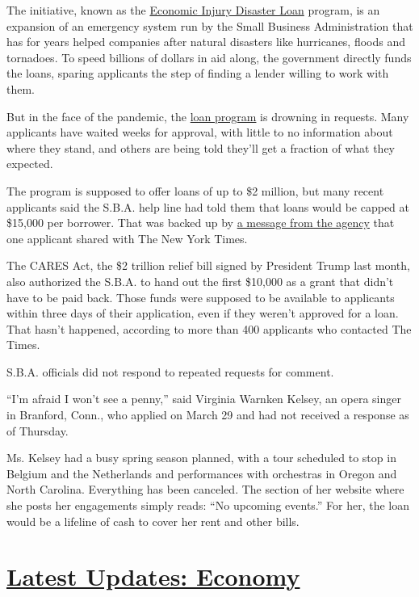 The initiative, known as the
\href{https://www.sba.gov/funding-programs/loans/coronavirus-relief-options/economic-injury-disaster-loan-emergency-advance}{Economic
Injury Disaster Loan} program, is an expansion of an emergency system
run by the Small Business Administration that has for years helped
companies after natural disasters like hurricanes, floods and tornadoes.
To speed billions of dollars in aid along, the government directly funds
the loans, sparing applicants the step of finding a lender willing to
work with them.

But in the face of the pandemic, the
\href{https://www.nytimes.com/2020/04/20/business/shake-shack-returning-loan-ppp-coronavirus.html}{loan
program} is drowning in requests. Many applicants have waited weeks for
approval, with little to no information about where they stand, and
others are being told they'll get a fraction of what they expected.

The program is supposed to offer loans of up to \$2 million, but many
recent applicants said the S.B.A. help line had told them that loans
would be capped at \$15,000 per borrower. That was backed up by
\href{https://int.nyt.com/data/documenthelper/6871-sba-note-about-15000-cap/optimized/full.pdf}{a
message from the agency} that one applicant shared with The New York
Times.

The CARES Act, the \$2 trillion relief bill signed by President Trump
last month, also authorized the S.B.A. to hand out the first \$10,000 as
a grant that didn't have to be paid back. Those funds were supposed to
be available to applicants within three days of their application, even
if they weren't approved for a loan. That hasn't happened, according to
more than 400 applicants who contacted The Times.

S.B.A. officials did not respond to repeated requests for comment.

``I'm afraid I won't see a penny,'' said Virginia Warnken Kelsey, an
opera singer in Branford, Conn., who applied on March 29 and had not
received a response as of Thursday.

Ms. Kelsey had a busy spring season planned, with a tour scheduled to
stop in Belgium and the Netherlands and performances with orchestras in
Oregon and North Carolina. Everything has been canceled. The section of
her website where she posts her engagements simply reads: ``No upcoming
events.'' For her, the loan would be a lifeline of cash to cover her
rent and other bills.

\hypertarget{latest-updates-economy}{%
\section{\texorpdfstring{\href{https://www.nytimes.com/live/2020/08/03/business/stock-market-today-coronavirus?action=click\&pgtype=Article\&state=default\&region=MAIN_CONTENT_1\&context=storylines_live_updates}{Latest
Updates:
Economy}}{Latest Updates: Economy}}\label{latest-updates-economy}}

